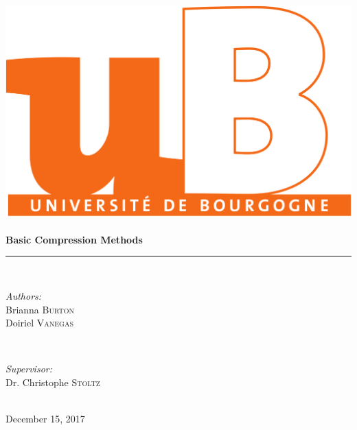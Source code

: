 \documentclass[11pt,a4paper,table]{article}
\begin{document}
\begin{titlepage}
\vspace*{\fill}
\newcommand{\HRule}{\rule{\linewidth}{0.5mm}}

\center

\includegraphics[scale=0.1]{logo.png}\\[1cm]
\\[0.5cm]

{ \Large \bfseries Basic Compression Methods}\\[0.4cm]
\HRule \\[1.5cm]

\begin{minipage}{0.4\textwidth}
\begin{flushleft} \large
\emph{Authors:}\\
Brianna \textsc{Burton}\\
Doiriel \textsc{Vanegas}
\end{flushleft}
\end{minipage}
~
\begin{minipage}{0.4\textwidth}
\begin{flushright} \large
\emph{Supervisor:} \\
Dr. Christophe \textsc{Stoltz}\\
\end{flushright}
\end{minipage}\\[2cm]

{\large December 15, 2017}\\[1cm]
\vspace*{\fill}

\end{titlepage}
\end{document}
